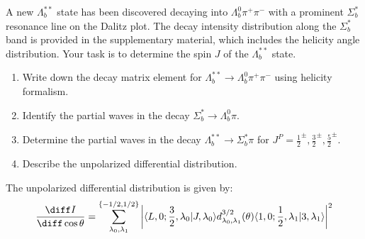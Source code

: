 A new \(\Lambda_b^{**}\) state has been discovered decaying into \(\Lambda_b^0 \pi^+ \pi^-\) with a prominent \(\Sigma_b^*\) resonance line on the Dalitz plot. The decay intensity distribution along the \(\Sigma_b^*\) band is provided in the supplementary material, which includes the helicity angle distribution. Your task is to determine the spin \(J\) of the \(\Lambda_b^{**}\) state.

\begin{enumerate}
    \item Write down the decay matrix element for \(\Lambda_b^{**} \to \Lambda_b^0 \pi^+ \pi^-\) using helicity formalism.
    \item Identify the partial waves in the decay \(\Sigma_b^* \to \Lambda_b^0 \pi\).
    \item Determine the partial waves in the decay \(\Lambda_b^{**} \to \Sigma_b^* \pi\) for \(J^P = \frac{1}{2}^\pm, \frac{3}{2}^\pm, \frac{5}{2}^\pm\).
    \item Describe the unpolarized differential distribution.
\end{enumerate}

The unpolarized differential distribution is given by:
$$
    \frac{\diff I}{\diff \cos \theta} = \sum_{\lambda_0, \lambda_1}^{\{-1/2,1/2\}} \left| \langle L, 0; \frac{3}{2}, \lambda_0 | J, \lambda_0 \rangle d^{3/2}_{\lambda_0, \lambda_1}(\theta) \langle 1, 0; \frac{1}{2}, \lambda_1 | 3, \lambda_1 \rangle \right|^2
$$